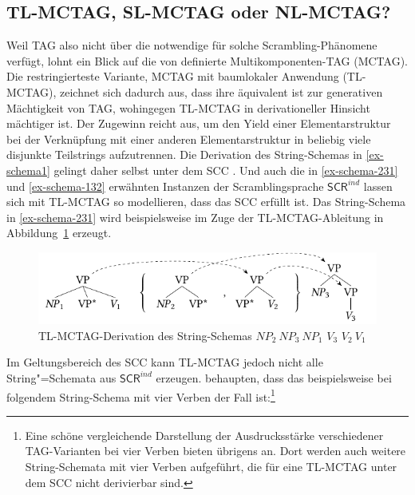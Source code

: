 \subsection{TL-MCTAG, SL-MCTAG oder NL-MCTAG?}

Weil TAG also nicht über die notwendige  für solche Scrambling-Phänomene verfügt, lohnt ein Blick auf die von \cite{Weir:88} definierte Multikomponenten-TAG (MCTAG). Die restringierteste Variante, MCTAG mit baumlokaler Anwendung (TL-MCTAG), zeichnet sich dadurch aus, dass ihre  äquivalent ist zur generativen Mächtigkeit von TAG, wohingegen TL-MCTAG in derivationeller Hinsicht mächtiger ist. Der Zugewinn reicht aus, um den Yield einer Elementarstruktur bei der Verknüpfung mit einer anderen Elementarstruktur in beliebig viele disjunkte Teilstrings aufzutrennen. Die Derivation des String-Schemas in \ref{ex-schema1} gelingt daher selbst unter dem SCC \citep[Abbildung~6]{Joshi:Becker:Rambow:00}. Und auch die in \ref{ex-schema-231} und \ref{ex-schema-132} erwähnten Instanzen der Scramblingsprache $\mathsf{SCR}^{ind}$ lassen sich mit TL-MCTAG so modellieren, dass das SCC erfüllt ist. Das String-Schema in \ref{ex-schema-231} wird beispielsweise im Zuge der TL-MCTAG-Ableitung in Abbildung~\ref{fig-schema-231} erzeugt. 
\begin{figure}[t]
\centering
\includegraphics{graphics/abb515.pdf}
\caption{\label{fig-schema-231}TL-MCTAG-Derivation des String-Schemas $\mathit{NP}_2 ~ \mathit{NP}_3 ~ \mathit{NP}_1 $ $V_3$ $V_2 ~ V_1$}
\end{figure}

Im Geltungsbereich des SCC kann TL-MCTAG jedoch nicht alle String"=Schemata aus $\mathsf{SCR}^{ind}$ erzeugen. \citet[175]{Joshi:Becker:Rambow:00} behaupten, dass das beispielsweise bei folgendem String-Schema mit vier Verben der Fall ist:\footnote{Eine schöne vergleichende Darstellung der Ausdrucksstärke verschiedener TAG-Varianten bei vier Verben bieten übrigens \citet[Fig.\,3,Fig.\,7]{Chen-Main:Joshi:08} an. Dort werden auch weitere String-Schemata mit vier Verben aufgeführt, die für eine TL-MCTAG unter dem SCC nicht derivierbar sind.}

